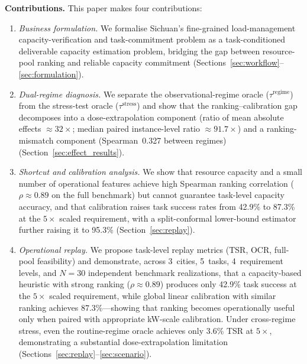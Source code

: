 \documentclass[utf8]{FrontiersinHarvard}
\begin{document}
\textbf{Contributions.} This paper makes four contributions:
\begin{enumerate}
    \item \textit{Business formulation.} We formalise Sichuan's
    fine-grained load-management capacity-verification and
    task-commitment problem as a task-conditioned deliverable
    capacity estimation problem, bridging the gap between
    resource-pool ranking and reliable capacity commitment
    (Sections~\ref{sec:workflow}--\ref{sec:formulation}).

    \item \textit{Dual-regime diagnosis.} We separate the
    observational-regime oracle ($\tau^{\mathrm{regime}}$) from
    the stress-test oracle ($\tau^{\mathrm{stress}}$) and show
    that the ranking--calibration gap decomposes into a
    dose-extrapolation component (ratio of mean absolute effects
    $\approx 32\times$; median paired instance-level ratio
    $\approx 91.7\times$) and a ranking-mismatch component (Spearman~0.327
    between regimes)
    (Section~\ref{sec:effect_results}).

    \item \textit{Shortcut and calibration analysis.} We show
    that resource capacity and a small number of operational
    features achieve high Spearman ranking correlation
    ($\rho \approx 0.89$ on the full benchmark) but
    cannot guarantee task-level capacity accuracy, and that
    calibration raises task success rates
    from 42.9\% to 87.3\% at the $5\times$ scaled requirement,
    with a split-conformal lower-bound estimator further
    raising it to 95.3\%
    (Section~\ref{sec:replay}).

    \item \textit{Operational replay.} We propose
    task-level replay metrics (TSR, OCR, full-pool feasibility)
    and demonstrate, across 3~cities, 5~tasks, 4~requirement
    levels, and $N=30$ independent benchmark realizations, that
    a capacity-based heuristic with strong ranking
    ($\rho \approx 0.89$) produces only 42.9\% task success at the
    $5\times$ scaled requirement, while global linear calibration with
    similar ranking achieves 87.3\%---showing
    that ranking becomes operationally useful only when paired
    with appropriate kW-scale calibration. Under cross-regime
    stress, even the routine-regime oracle achieves only 3.6\%
    TSR at $5\times$, demonstrating
    a substantial dose-extrapolation limitation
    (Sections~\ref{sec:replay}--\ref{sec:scenario}).
\end{enumerate}
\end{document}
